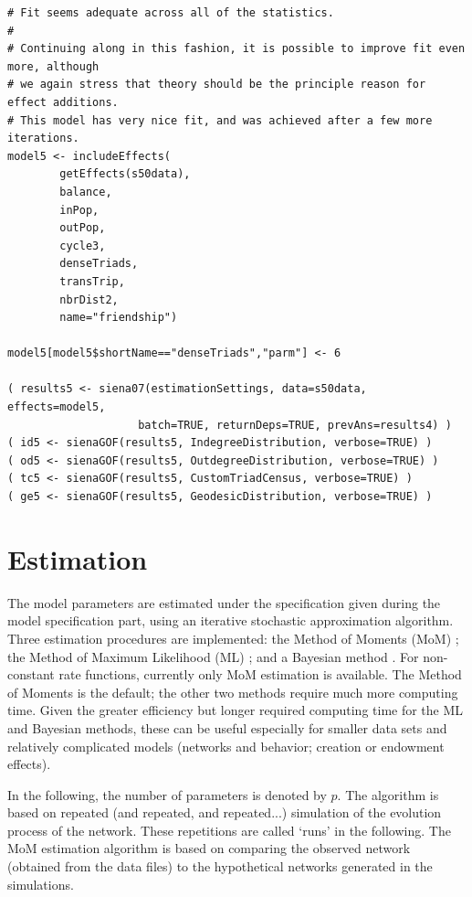 \documentclass[a4paper,fleqn,11pt]{article}
\newcommand{\+}{\, + \,}
\begin{document}
{\begin{footnotesize}
\begin{verbatim}
# Fit seems adequate across all of the statistics.
#
# Continuing along in this fashion, it is possible to improve fit even more, although
# we again stress that theory should be the principle reason for effect additions.
# This model has very nice fit, and was achieved after a few more iterations.
model5 <- includeEffects(
		getEffects(s50data),
		balance,
		inPop,
		outPop,
		cycle3,
		denseTriads,
		transTrip,
		nbrDist2,
		name="friendship")

model5[model5$shortName=="denseTriads","parm"] <- 6

( results5 <- siena07(estimationSettings, data=s50data, effects=model5,
					batch=TRUE, returnDeps=TRUE, prevAns=results4) )
( id5 <- sienaGOF(results5, IndegreeDistribution, verbose=TRUE) )
( od5 <- sienaGOF(results5, OutdegreeDistribution, verbose=TRUE) )
( tc5 <- sienaGOF(results5, CustomTriadCensus, verbose=TRUE) )
( ge5 <- sienaGOF(results5, GeodesicDistribution, verbose=TRUE) )
\end{verbatim}
\end{footnotesize}



\newpage

\section{Estimation}
\label{S_Est}

The model parameters are estimated under the specification given
during the model specification part, using an iterative stochastic
approximation algorithm.
Three estimation procedures are implemented:
the Method of Moments (MoM) \citep*{Snijders01, SnijdersEA07};
 the Method of Maximum Likelihood (ML) \citep{SnijdersEA10a};
 and a Bayesian method
 \citep{Koskinen04, KoskinenSnijders07,SchweinbergerSnijders07c}.
 For non-constant rate functions, currently only
 MoM estimation is available.
 The Method of Moments is the default;
 the other two methods require much more computing time.
 Given the greater efficiency but longer required computing time
 for the ML and Bayesian methods,
 these can be useful especially for smaller data sets
 and relatively complicated models
 (networks and behavior; creation or endowment effects).


In the following, the number of
parameters is denoted by $p$. The algorithm %
is based on repeated
(and repeated, and repeated...) simulation of the evolution
process of the network. These repetitions are called `runs' in the
following. The MoM estimation algorithm is based on comparing the
observed network (obtained from the data files)
to the hypothetical networks generated in the simulations.

}
\end{document}
